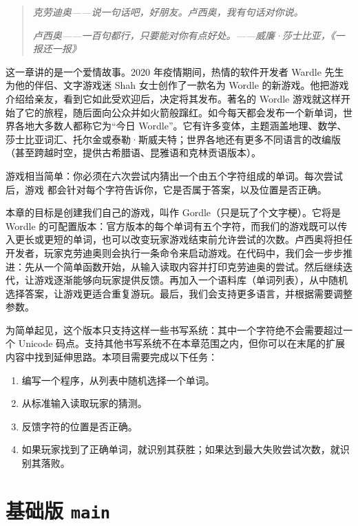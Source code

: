 \begin{quote}
\emph{克劳迪奥——说一句话吧，好朋友。卢西奥，我有句话对你说。}

\emph{卢西奥——一百句都行，只要能对你有点好处。——威廉·莎士比亚，《一报还一报》}
\end{quote}

这一章讲的是一个爱情故事。2020 年疫情期间，热情的软件开发者 Wardle 先生为他的伴侣、文字游戏迷 Shah 女士创作了一款名为 Wordle 的新游戏。他把游戏介绍给亲友，看到它如此受欢迎后，决定将其发布。著名的 Wordle 游戏就这样开始了它的旅程，随后面向公众并如火箭般蹿红。如今每天都会发布一个新单词，世界各地大多数人都称它为“今日 Wordle”。它有许多变体，主题涵盖地理、数学、莎士比亚词汇、托尔金或泰勒·斯威夫特；世界各地还有更多不同语言的改编版（甚至跨越时空，提供古希腊语、昆雅语和克林贡语版本）。

游戏相当简单：你必须在六次尝试内猜出一个由五个字符组成的单词。每次尝试后，游戏
都会针对每个字符告诉你，它是否属于答案，以及位置是否正确。

本章的目标是创建我们自己的游戏，叫作 Gordle（只是玩了个文字梗）。它将是 Wordle 的可配置版本：官方版本的每个单词有五个字符，而我们的游戏既可以传入更长或更短的单词，也可以改变玩家游戏结束前允许尝试的次数。卢西奥将担任开发者，玩家克劳迪奥则会执行一条命令来启动游戏。在代码中，我们会一步步推进：先从一个简单函数开始，从输入读取内容并打印克劳迪奥的尝试。然后继续迭代，让游戏逐渐能够向玩家提供反馈。再加入一个语料库（单词列表），从中随机选择答案，让游戏更适合重复游玩。最后，我们会支持更多语言，并根据需要调整参数。

为简单起见，这个版本只支持这样一些书写系统：其中一个字符绝不会需要超过一个 Unicode 码点。支持其他书写系统不在本章范围之内，但你可以在末尾的扩展内容中找到延伸思路。本项目需要完成以下任务：

\begin{enumerate}
  \item 编写一个程序，从列表中随机选择一个单词。
  \item 从标准输入读取玩家的猜测。
  \item 反馈字符的位置是否正确。
  \item 如果玩家找到了正确单词，就识别其获胜；如果达到最大失败尝试次数，就识别其落败。
\end{enumerate}

\section{基础版 \texttt{main}}

